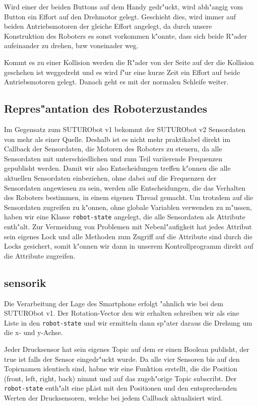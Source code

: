 \documentclass[8pt]{article}
\begin{document}
Wird einer der beiden Buttons auf dem Handy gedr"uckt, wird abh"angig vom Button ein Effort auf den Drehmotor gelegt. Geschieht dies, wird immer auf beiden Antriebsmotoren der gleiche Effort angelegt, da durch unsere Konstruktion des Roboters es sonst vorkommen k"onnte, dass sich beide R"ader aufeinander zu drehen, bzw voneinader weg.

Kommt es zu einer Kollision werden die R"ader von der Seite auf der die Kollision geschehen ist weggedreht und es wird f"ur eine kurze Zeit ein Effort auf beide Antriebsmotoren gelegt. Danach geht es mit der normalen Schleife weiter.


\subsection{Repres"antation des Roboterzustandes}
Im Gegensatz zum SUTURObot v1 bekommt der SUTURObot v2 Sensordaten von mehr als einer Quelle. Deshalb ist es nicht mehr praktikabel direkt im Callback der Sensordaten, die Motoren des Roboters zu steuern, da alle Sensordaten mit unterschiedlichen und zum Teil variierende Frequenzen gepublisht werden. Damit wir also Entscheidungen treffen k"onnen die alle aktuellen Sensordaten einbeziehen, ohne dabei auf die Frequenzen der Sensordaten angewiesen zu sein, werden alle Entscheidungen, die das Verhalten des Roboters bestimmen, in einem eigenen Thread gemacht. Um trotzdem auf die Sensordaten zugreifen zu k"onnen, ohne globale Variablen verwenden zu m"ussen, haben wir eine Klasse \texttt{robot-state} angelegt, die alle Sensordaten als Attribute enth"alt. Zur Vermeidung von Problemen mit Nebenl"aufigkeit hat jedes Attribut sein eigenes Lock und alle Methoden zum Zugriff auf die Attribute sind durch die Locks gesichert, somit k"onnen wir dann in unserem Kontrollprogramm direkt auf die Attribute zugreifen. 


\subsection{sensorik}
Die Verarbeitung der Lage des Smartphone erfolgt "ahnlich wie bei dem SUTURObot v1. Der Rotation-Vector den wir erhalten schreiben wir als eine Liste in den \texttt{robot-state} und wir ermitteln dann sp"ater daraus die Drehung um die x- und y-Achse.

Jeder Drucksensor hat sein eigenes Topic auf dem er einen Boolean publisht, der true ist falls der Sensor eingedr"uckt wurde. Da alle vier Sensoren bis auf den Topicnamen identisch sind, habne wir eine Funktion erstellt, die die Position (front, left, right, back) nimmt und auf das zugeh"orige Topic subscribt. Der \texttt{robot-state} enth"alt eine pList mit den Positionen und den entsprechenden Werten der Drucksensoren, welche bei jedem Callback aktualisiert wird.
\end{document}
